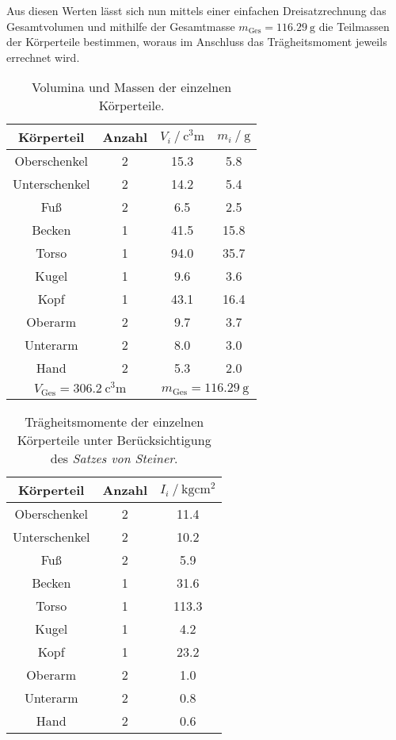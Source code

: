 Aus diesen Werten lässt sich nun mittels einer einfachen Dreisatzrechnung das Gesamtvolumen und mithilfe der Gesamtmasse ${m_\text{Ges}=\SI{116.29}{\gram}}$ 
die Teilmassen der Körperteile bestimmen, woraus im Anschluss das Trägheitsmoment jeweils errechnet wird. 

\begin{table}
\centering
\caption{Volumina und Massen der einzelnen Körperteile.}
\label{tab:mass_vol}
\begin{tabular}{c c S[table-format=2.1] S[table-format=2.1]}
    \toprule
    {Körperteil} & {Anzahl} & {$V_i\:/\:\si{\cubic\centi\meter}$} & {$m_i\:/\:\si{\gram}$} \\
    \midrule
    Oberschenkel    & 2 & 15.3 &  5.8 \\
    Unterschenkel   & 2 & 14.2 &  5.4 \\
    Fuß             & 2 &  6.5 &  2.5 \\
    Becken          & 1 & 41.5 & 15.8 \\
    Torso           & 1 & 94.0 & 35.7 \\
    Kugel           & 1 &  9.6 &  3.6 \\
    Kopf            & 1 & 43.1 & 16.4 \\
    Oberarm         & 2 &  9.7 &  3.7 \\
    Unterarm        & 2 &  8.0 &  3.0 \\
    Hand            & 2 &  5.3 &  2.0 \\
    \midrule
     &  \\
    \bottomrule
\end{tabular}
\end{table}

\begin{table}
\centering
\caption{Trägheitsmomente der einzelnen Körperteile unter Berücksichtigung des \textit{Satzes von Steiner}.}
\label{tab:traegh}
\begin{tabular}{c c S[table-format=3.1]}
    \toprule
    {Körperteil} & {Anzahl} & {$I_i\:/\:\si{\kilo\gram\centi\meter\squared}$} \\
    \midrule
    Oberschenkel    & 2 &  11.4 \\
    Unterschenkel   & 2 &  10.2 \\
    Fuß             & 2 &   5.9 \\
    Becken          & 1 &  31.6 \\
    Torso           & 1 & 113.3 \\
    Kugel           & 1 &   4.2 \\
    Kopf            & 1 &  23.2 \\
    Oberarm         & 2 &   1.0 \\
    Unterarm        & 2 &   0.8 \\
    Hand            & 2 &   0.6 \\
    \bottomrule
\end{tabular}
\end{table}

